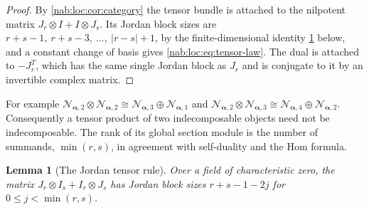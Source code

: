 \documentclass[11pt,letterpaper]{article}
\newtheorem{lemma}[lemma]{Lemma}
\theoremstyle{definition}
\theoremstyle{remark}
\newcommand{\profile}{\boldsymbol\alpha}
\newcommand{\NN}[1]{\mathcal N_{\profile,#1}}
\numberwithin{equation}{section}
\begin{document}
\begin{proof}
By \cref{nab:loc:cor:category} the tensor bundle is attached to the nilpotent
matrix $J_r\otimes I+I\otimes J_s$. Its Jordan block sizes are
$r+s-1,\ r+s-3,\ \ldots,\ |r-s|+1$, by the finite-dimensional identity
\cref{nab:loc:lem:tensor} below, and a constant change of basis gives
\eqref{nab:loc:eq:tensor-law}. The dual is attached to $-J_r^T$, which has the
same single Jordan block as $J_r$ and is conjugate to it by an invertible
complex matrix.
\end{proof}

For example $\NN2\otimes\NN2\cong\NN3\oplus\NN1$ and
$\NN2\otimes\NN3\cong\NN4\oplus\NN2$. Consequently a tensor product of two
indecomposable objects need not be indecomposable. The rank of its global
section module is the number of summands, $\min(r,s)$, in agreement with
self-duality and the Hom formula.

\begin{lemma}[The Jordan tensor rule]\label{nab:loc:lem:tensor}
Over a field of characteristic zero, the matrix $J_r\otimes I_s+I_r\otimes J_s$
has Jordan block sizes $r+s-1-2j$ for $0\leq j<\min(r,s)$.
\end{lemma}
\end{document}
